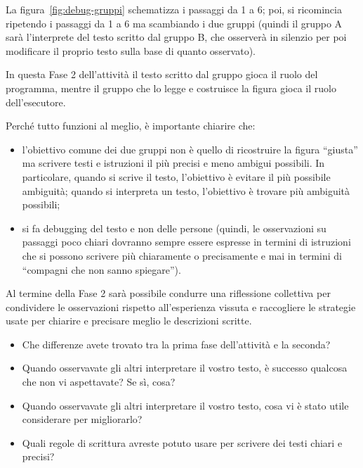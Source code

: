 La figura~\ref{fig:debug-gruppi} schematizza i passaggi da 1 a 6; poi, si ricomincia ripetendo i passaggi da 1 a 6 ma scambiando i due gruppi (quindi il gruppo A sarà l'interprete del testo scritto dal gruppo B, che osserverà in silenzio per poi modificare il proprio testo sulla base di quanto osservato).



In questa Fase 2 dell'attività il testo scritto dal gruppo gioca il ruolo del programma, mentre il gruppo che lo legge e costruisce la figura gioca il ruolo dell'esecutore.

\begin{attenzione}\label{aspetti-a-cui-fare-attenzione}


Perché tutto funzioni al meglio, è importante chiarire che:


\begin{itemize}
\item
  l'obiettivo comune dei due gruppi non è quello di ricostruire la figura ``giusta'' ma scrivere testi e istruzioni il più precisi e meno ambigui possibili. In particolare, quando si scrive il testo, l'obiettivo è evitare il più possibile ambiguità; quando si interpreta un testo, l'obiettivo è trovare più ambiguità possibili;
\item
  si fa debugging del testo e non delle persone (quindi, le osservazioni su passaggi poco chiari dovranno sempre essere espresse in termini di istruzioni che si possono scrivere più chiaramente o precisamente e mai in termini di ``compagni che non sanno spiegare'').
\end{itemize}
\end{attenzione}

Al termine della Fase 2 sarà possibile condurre una riflessione collettiva per condividere le osservazioni rispetto all'esperienza vissuta e raccogliere le strategie usate per chiarire e precisare meglio le descrizioni scritte.

\begin{domandestimolo}\label{domande-stimolo-1}

\begin{itemize}
\item
  Che differenze avete trovato tra la prima fase dell'attività e la seconda?
\item
  Quando osservavate gli altri interpretare il vostro testo, è successo qualcosa che non vi aspettavate? Se sì, cosa?
\item
  Quando osservavate gli altri interpretare il vostro testo, cosa vi è stato utile considerare per migliorarlo?
\item
  Quali regole di scrittura avreste potuto usare per scrivere dei testi chiari e precisi?
\end{itemize}
\end{domandestimolo}

